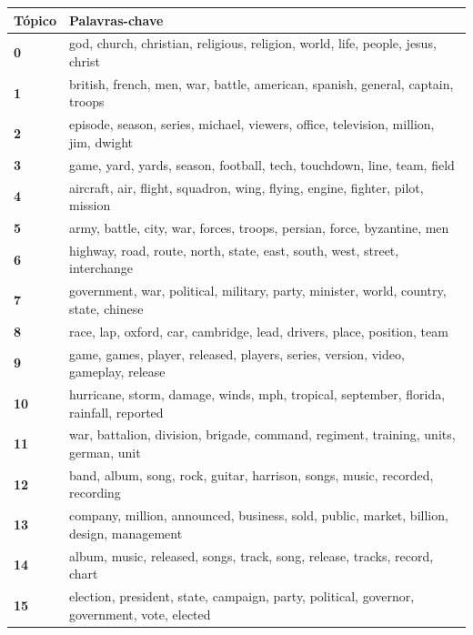 \begin{table}[htpb]
    \centering
    \scriptsize
    \begin{tabularx}{\textwidth}{@{}l X@{}}
        \toprule
        \textbf{Tópico} & \textbf{Palavras-chave} \\
        \midrule
        \textbf{0} & god, church, christian, religious, religion, world, life, people, jesus, christ \\
        \textbf{1} & british, french, men, war, battle, american, spanish, general, captain, troops \\
        \textbf{2} & episode, season, series, michael, viewers, office, television, million, jim, dwight \\
        \textbf{3} & game, yard, yards, season, football, tech, touchdown, line, team, field \\
        \textbf{4} & aircraft, air, flight, squadron, wing, flying, engine, fighter, pilot, mission \\
        \textbf{5} & army, battle, city, war, forces, troops, persian, force, byzantine, men \\
        \textbf{6} & highway, road, route, north, state, east, south, west, street, interchange \\
        \textbf{7} & government, war, political, military, party, minister, world, country, state, chinese \\
        \textbf{8} & race, lap, oxford, car, cambridge, lead, drivers, place, position, team \\
        \textbf{9} & game, games, player, released, players, series, version, video, gameplay, release \\
        \textbf{10} & hurricane, storm, damage, winds, mph, tropical, september, florida, rainfall, reported \\
        \textbf{11} & war, battalion, division, brigade, command, regiment, training, units, german, unit \\
        \textbf{12} & band, album, song, rock, guitar, harrison, songs, music, recorded, recording \\
        \textbf{13} & company, million, announced, business, sold, public, market, billion, design, management \\
        \textbf{14} & album, music, released, songs, track, song, release, tracks, record, chart \\
        \textbf{15} & election, president, state, campaign, party, political, governor, government, vote, elected \\

\end{tabularx}
\end{table}
